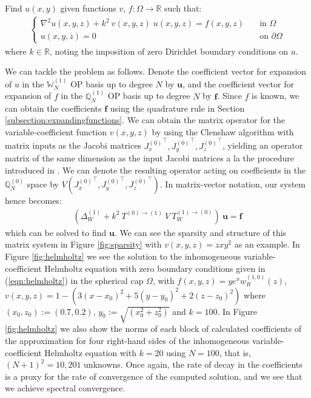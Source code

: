 \documentclass[11pt, oneside]{article}   	%
\newcommand{\bstodo}{\todo[color=pink]}
\newcommand{\R}{\mathbb{R}}
\newcommand{\genjac}{R}
\newcommand{\genjacw}{w_\genjac}
\newcommand{\bigscop}{{\mathbb{Q}}}
\newcommand{\bigWNi}{\mathbb{W}_N^{(1)}}
\newcommand{\bigscopi}{\bigscop^{(1)}}
\newcommand{\bigscopNi}{\bigscopi_{N}}
\newcommand{\bigscopo}{\bigscop^{(0)}}
\newcommand{\bigscopNo}{\bigscopo_{N}}
\begin{document}
Find $u(x,y)$ given functions $v$, $f : \Omega \to \R$ such that:
\begin{align}
	\begin{cases}
    		\nabla^2 u(x,y,z) + k^2 \: v(x,y,z) \; u(x,y,z) = f(x,y,z) &\quad \text{in } \Omega \\
		u(x,y,z) = 0 &\quad \text{on } \partial \Omega
	\end{cases}
	\label{eqn:helmholtz}
\end{align}
where $k \in \R$, noting the imposition of zero Dirichlet boundary conditions on $u$.

We can tackle the problem as follows. Denote the coefficient vector for expansion of $u$ in the $\bigWNi$ OP basis up to degree $N$ by $\mathbf{u}$, and the coefficient vector for expansion of $f$ in the $\bigscopNi$ OP basis up to degree $N$ by $\mathbf{f}$. Since $f$ is known, we can obtain  the coefficients $\mathbf{f}$ using the quadrature rule in Section \ref{subsection:expandingfunctions}. We can obtain the matrix operator for the variable-coefficient function $v(x,y,z)$ by using the Clenshaw algorithm with matrix inputs as the Jacobi matrices ${J_x^{(0)}}^\top, {J_y^{(0)}}^\top, {J_z^{(0)}}^\top$, yielding an operator matrix of the same dimension as the input Jacobi matrices a la the procedure introduced in \cite{olver2019triangle}. We can denote the resulting operator acting on coefficients in the $\bigscopNo$ space by $V({J_x^{(0)}}^\top, {J_y^{(0)}}^\top, {J_z^{(0)}}^\top)$. In matrix-vector notation, our system hence becomes:
\begin{align*}
    (\Delta_W^{(1)} + k^2 \:T^{(0)\to(1)} \: V \: T_W^{(1)\to(0)}) \: \mathbf{u} = \mathbf{f}
\end{align*}
which can be solved to find $\mathbf{u}$. We can see the sparsity and structure of this matrix system in Figure \ref{fig:sparsity} with $v(x,y,z) = zxy^2$ as an example. In Figure \ref{fig:helmholtz} we see the solution to the inhomogeneous variable-coefficient Helmholtz equation with zero boundary conditions given in (\ref{eqn:helmholtz}) in the spherical cap $\Omega$, with $f(x,y,z) = y e^x \genjacw^{(1,0)}(z)$, $v(x,y,z) = 1 - (3(x-x_0)^2 + 5(y-y_0)^2 + 2(z-z_0)^2)$ where $(x_0, z_0) := (0.7, 0.2)$, $y_0 := \sqrt{(x_0^2 + z_0^2)}$ and $k = 100$. In Figure \ref{fig:helmholtz} we also show the norms of each block of calculated coefficients of the approximation for four right-hand sides of the inhomogeneous variable-coefficient Helmholtz equation with $k=20$ using $N = 100$, that is, $(N+1)^2 = 10,201$ unknowns. Once again, the rate of decay in the coefficients is a proxy for the rate of convergence of the computed solution, and we see that we achieve spectral convergence. \bstodo{Add to the comments here}
\end{document}

